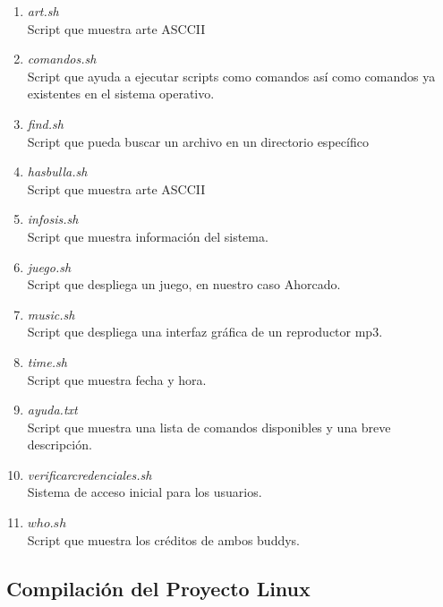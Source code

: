 \documentclass{article}
\begin{document}
\begin{enumerate}
\item \textit{art.sh}\\
Script que muestra arte ASCCII
\\
\item \textit{comandos.sh}\\
Script que ayuda a ejecutar scripts como comandos así como comandos ya existentes en el sistema operativo.
\\
\item \textit{find.sh}\\
Script que pueda buscar un archivo en un directorio específico
\\
\item \textit{hasbulla.sh}\\
Script que muestra arte ASCCII
\\
\item \textit{infosis.sh}\\
Script que muestra información del sistema.
\\
\item \textit{juego.sh}\\
Script que despliega un juego, en nuestro caso Ahorcado.
\\
\item \textit{music.sh}\\
Script que despliega una interfaz gráfica de un reproductor mp3.
\\
\item \textit{time.sh}\\
Script que muestra fecha y hora.
\\
\item \textit{ayuda.txt}\\
Script que muestra una lista de comandos disponibles y una breve descripción. 
\\
\item \textit{verificar}\textunderscore \textit{credenciales.sh}\\
Sistema de acceso inicial para los usuarios.
\\
\item $who.sh$\\
Script que muestra los créditos de ambos buddys.
\end{enumerate}

\subsection*{Compilación del Proyecto Linux}
\end{document}
